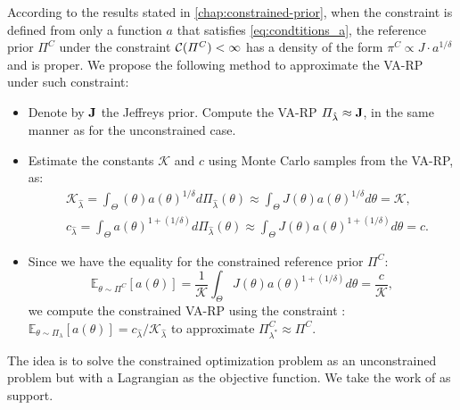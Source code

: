 According to the results stated in \cref{chap:constrained-prior}, when the constraint is defined from only a function $a$ that satisfies \cref{eq:condtitions_a}, the reference prior $\varPi^C$ under the constraint $\mathcal{C}(\varPi^C)<\infty$ has a density of the form $\pi^C\propto J\cdot a^{1/\delta}$ and is proper.
We propose the following method to approximate the VA-RP under such constraint:
\begin{itemize}
    \item Denote by $\mathbf{J}$ the Jeffreys prior. Compute the VA-RP $\varPi_{\hat\lambda} \approx \mathbf{J}$, in the same manner as for the unconstrained case.
    \item Estimate the constants $\mathcal{K}$ and $c$ using Monte Carlo samples from the VA-RP, as: 
    \begin{equation}
        \begin{aligned}
        &\mathcal{K}_{\hat\lambda} = \int_{\Theta} (\theta)a(\theta)^{1/\delta}d\varPi_{\hat\lambda}(\theta)   \approx \int_{\Theta} J(\theta)a(\theta)^{1/\delta}d\theta = \mathcal{K}, \\
     & c_{\hat\lambda} =  \int_{\Theta} a(\theta)^{1+(1/\delta)}d\varPi_{\hat\lambda}(\theta) \approx \int_{\Theta} J(\theta)a(\theta)^{1+(1/\delta)}d\theta = c .
        \end{aligned}
    \end{equation}
    \item Since we have the equality for the constrained reference prior $\varPi^C$:
    \begin{equation} 
        \mathbb{E}_{\theta \sim \varPi^C}[a(\theta)] =   \frac{1}{\mathcal{K}}\int_{\Theta}J(\theta)a(\theta)^{1+(1/\delta)}d\theta  = \frac{c}{\mathcal{K}}, 
    \end{equation}
    we compute the constrained VA-RP using the constraint : $\mathbb{E}_{\theta \sim \varPi_{\lambda}}[a(\theta)] = c_{\hat\lambda} / \mathcal{K}_{\hat\lambda}$ to approximate $\varPi^C_{\lambda^\ast} \approx \varPi^C$.
    \end{itemize}





    The idea is to solve the constrained optimization problem as an unconstrained problem but with a Lagrangian as the objective function. We take the work of \citet{nocedal_numerical_2006} as support. 

